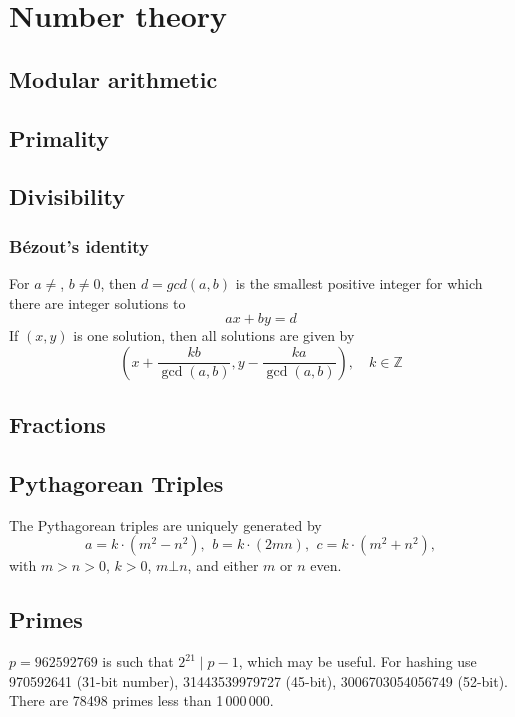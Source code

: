 \chapter{Number theory}

\section{Modular arithmetic}

\section{Primality}

\section{Divisibility}

	\subsection{Bézout's identity}
	For $a \neq $, $b \neq 0$, then $d=gcd(a,b)$ is the smallest positive integer for which there are integer solutions to
	$$ax+by=d$$
	If $(x,y)$ is one solution, then all solutions are given by
	$$\left(x+\frac{kb}{\gcd(a,b)}, y-\frac{ka}{\gcd(a,b)}\right), \quad k\in\mathbb{Z}$$


\section{Fractions}

\section{Pythagorean Triples}
 The Pythagorean triples are uniquely generated by
 \[ a=k\cdot (m^{2}-n^{2}),\ \,b=k\cdot (2mn),\ \,c=k\cdot (m^{2}+n^{2}), \]
 with $m > n > 0$, $k > 0$, $m \bot n$, and either $m$ or $n$ even.

\section{Primes}
	$p=962592769$ is such that $2^{21} \mid p-1$, which may be useful. For hashing
	use 970592641 (31-bit number), 31443539979727 (45-bit), 3006703054056749
	(52-bit). There are 78498 primes less than 1\,000\,000.

